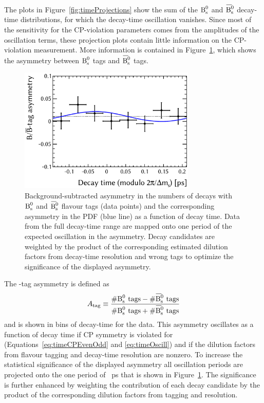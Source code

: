 The plots in Figure~\ref{fig:timeProjections} show the sum of the $\text{B}_\text{s}^\text{0}$ and $\Bsbar$ decay-time distributions, for which the decay-time
oscillation vanishes. Since most of the sensitivity for the CP-violation parameters comes from the amplitudes of the oscillation terms,
these projection plots contain little information on the CP-violation measurement. More information is contained in
Figure~\ref{fig:BBbarAsymmetry}, which shows the asymmetry between $\text{B}_\text{s}^\text{0}$ tags and $\Bsbar$ tags.
\begin{figure}[htb]
  \centering
  \includegraphics[width=0.75\textwidth]{graphics/results/asym}
  \caption{Background-subtracted asymmetry in the numbers of decays with $\text{B}_\text{s}^\text{0}$ and $\Bsbar$ flavour tags (data points)
           and the corresponding asymmetry in the PDF (blue line) as a function of decay time.
           Data from the full decay-time range are mapped onto one period of the expected oscillation in the asymmetry.
           Decay candidates are weighted by the product of the corresponding estimated dilution factors from decay-time resolution
           and wrong tags to optimize the significance of the displayed asymmetry.}
  \label{fig:BBbarAsymmetry}
\end{figure}

The \BsBsbar-tag asymmetry is defined as
\[
  A_{\text{tag}} \equiv \frac{\#\Bs{}\text{ tags} - \#\Bsbar{}\text{ tags}}{\#\Bs{}\text{ tags} + \#\Bsbar{}\text{ tags}}
\]
and is shown in bins of decay-time for the data. This asymmetry oscillates as a function of decay time if CP symmetry is violated for
\BstoJpsiKK{} (Equations~\ref{eq:timeCPEvenOdd} and \ref{eq:timeOscill}) and if the dilution factors from flavour tagging and decay-time
resolution are nonzero. To increase the statistical significance of the displayed asymmetry all oscillation periods are projected onto the
one period of ~ps that is shown in Figure~\ref{fig:BBbarAsymmetry}. The significance is further enhanced by weighting the
contribution of each decay candidate by the product of the corresponding dilution factors from tagging and resolution.


